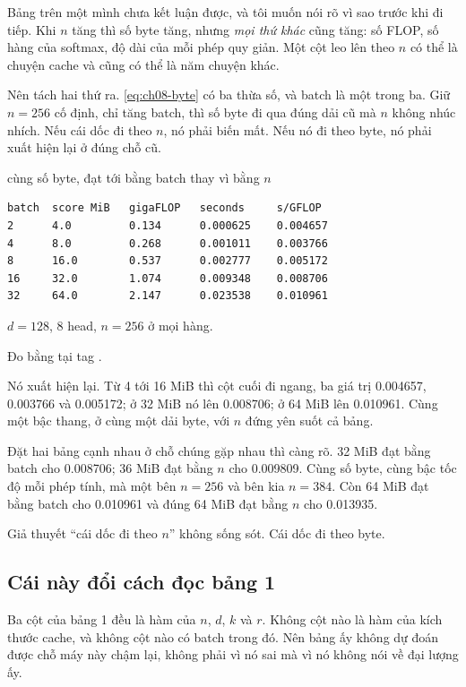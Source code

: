 %
Bảng trên một mình chưa kết luận được, và tôi muốn nói rõ vì sao trước khi đi
tiếp. Khi \(n\) tăng thì số byte tăng, nhưng \emph{mọi thứ khác} cũng tăng: số
FLOP, số hàng của softmax, độ dài của mỗi phép quy giản. Một cột leo lên theo
\(n\) có thể là chuyện cache và cũng có thể là năm chuyện khác.

Nên tách hai thứ ra. \eqref{eq:ch08-byte} có ba thừa số, và batch là một trong
ba. Giữ \(n = 256\) cố định, chỉ tăng batch, thì số byte đi qua đúng dải cũ mà
\(n\) không nhúc nhích. Nếu cái dốc đi theo \(n\), nó phải biến mất. Nếu nó đi
theo byte, nó phải xuất hiện lại ở đúng chỗ cũ.

\begin{measured}{cùng số byte, đạt tới bằng batch thay vì bằng \(n\)}
\begin{verbatim}
batch  score MiB   gigaFLOP   seconds     s/GFLOP
2      4.0         0.134      0.000625    0.004657
4      8.0         0.268      0.001011    0.003766
8      16.0        0.537      0.002777    0.005172
16     32.0        1.074      0.009348    0.008706
32     64.0        2.147      0.023538    0.010961
\end{verbatim}

\(d = 128\), 8 head, \(n = 256\) ở mọi hàng.

Đo bằng  tại tag .
\end{measured}

Nó xuất hiện lại. Từ 4 tới 16 MiB thì cột cuối đi ngang, ba giá trị 0.004657,
0.003766 và 0.005172;
ở 32 MiB nó lên 0.008706; ở 64 MiB lên 0.010961. Cùng một bậc thang, ở cùng một
dải byte, với \(n\) đứng yên suốt cả bảng.

Đặt hai bảng cạnh nhau ở chỗ chúng gặp nhau thì càng rõ. 32 MiB đạt bằng batch
cho 0.008706; 36 MiB đạt bằng \(n\) cho 0.009809. Cùng số byte, cùng bậc tốc độ
mỗi phép tính, mà một bên \(n = 256\) và bên kia \(n = 384\). Còn 64 MiB đạt
bằng batch cho 0.010961 và đúng 64 MiB đạt bằng \(n\) cho 0.013935.

Giả thuyết \enquote{cái dốc đi theo \(n\)} không sống sót. Cái dốc đi theo byte.

\subsection*{Cái này đổi cách đọc bảng 1}

%
Ba cột của bảng 1 đều là hàm của \(n\), \(d\), \(k\) và \(r\). Không cột nào là
hàm của kích thước cache, và không cột nào có batch trong đó. Nên bảng ấy không
dự đoán được chỗ máy này chậm lại, không phải vì nó sai mà vì nó không nói về
đại lượng ấy.

